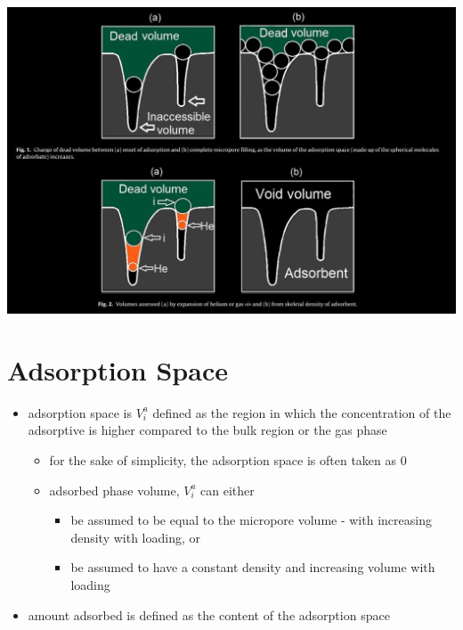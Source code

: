 \documentclass[11pt]{article}
\begin{document}
\begin{itemize}
\begin{itemize}
\begin{itemize}
\begin{center}
\includegraphics[width=.9\linewidth]{./voidvolumecalculation.jpg}
\end{center}
\end{itemize}
\end{itemize}
\end{itemize}

\section{Adsorption Space}
\label{sec:orgca36f5d}
\begin{itemize}
\item adsorption space is \(V _i ^a\) defined as the region in which the concentration of the adsorptive is higher compared to the bulk region or the gas phase \cite{Rouquerol2016}
\begin{itemize}
\item for the sake of simplicity, the adsorption space is often taken as 0 \cite{Rouquerol2016}
\item adsorbed phase volume, \(V _i ^a\) can either \cite{Rouquerol2016}
\begin{itemize}
\item be assumed to be equal to the micropore volume - with increasing density with loading, or
\item be assumed to have a constant density and increasing volume with loading
\end{itemize}
\end{itemize}

\item amount adsorbed is defined as the content of the adsorption space \cite{Rouquerol2016}
\end{itemize}
\end{document}
